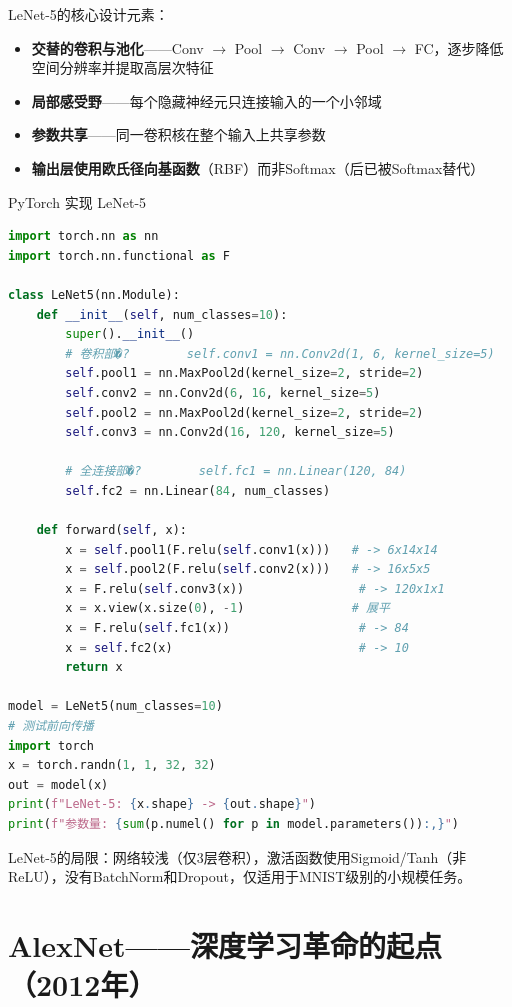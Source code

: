 LeNet-5的核心设计元素：
\begin{itemize}
    \item \textbf{交替的卷积与池化}——Conv $\to$ Pool $\to$ Conv $\to$ Pool $\to$ FC，逐步降低空间分辨率并提取高层次特征
    \item \textbf{局部感受野}——每个隐藏神经元只连接输入的一个小邻域
    \item \textbf{参数共享}——同一卷积核在整个输入上共享参数
    \item \textbf{输出层使用欧氏径向基函数}（RBF）而非Softmax（后已被Softmax替代）
\end{itemize}

\begin{mycode}{PyTorch 实现 LeNet-5}
\begin{lstlisting}[language=Python]
import torch.nn as nn
import torch.nn.functional as F

class LeNet5(nn.Module):
    def __init__(self, num_classes=10):
        super().__init__()
        # 卷积部�?        self.conv1 = nn.Conv2d(1, 6, kernel_size=5)
        self.pool1 = nn.MaxPool2d(kernel_size=2, stride=2)
        self.conv2 = nn.Conv2d(6, 16, kernel_size=5)
        self.pool2 = nn.MaxPool2d(kernel_size=2, stride=2)
        self.conv3 = nn.Conv2d(16, 120, kernel_size=5)

        # 全连接部�?        self.fc1 = nn.Linear(120, 84)
        self.fc2 = nn.Linear(84, num_classes)

    def forward(self, x):
        x = self.pool1(F.relu(self.conv1(x)))   # -> 6x14x14
        x = self.pool2(F.relu(self.conv2(x)))   # -> 16x5x5
        x = F.relu(self.conv3(x))                # -> 120x1x1
        x = x.view(x.size(0), -1)               # 展平
        x = F.relu(self.fc1(x))                  # -> 84
        x = self.fc2(x)                          # -> 10
        return x

model = LeNet5(num_classes=10)
# 测试前向传播
import torch
x = torch.randn(1, 1, 32, 32)
out = model(x)
print(f"LeNet-5: {x.shape} -> {out.shape}")
print(f"参数量: {sum(p.numel() for p in model.parameters()):,}")
\end{lstlisting}
\end{mycode}

LeNet-5的局限：网络较浅（仅3层卷积），激活函数使用Sigmoid/Tanh（非ReLU），没有BatchNorm和Dropout，仅适用于MNIST级别的小规模任务。

\section{AlexNet——深度学习革命的起点（2012年）}

